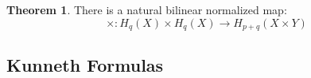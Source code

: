 \documentclass[11pt, oneside]{amsart}   	%
\theoremstyle{definition}
\newtheorem{theorem}{Theorem}[section]
\begin{document}
\begin{theorem}
	There is a natural bilinear normalized map:
	\begin{equation}
		\times : H_q(X)\times H_q(X)\rightarrow H_{p + q}(X\times Y)
	\end{equation}
\end{theorem}

\subsection{Kunneth Formulas}
\end{document}
